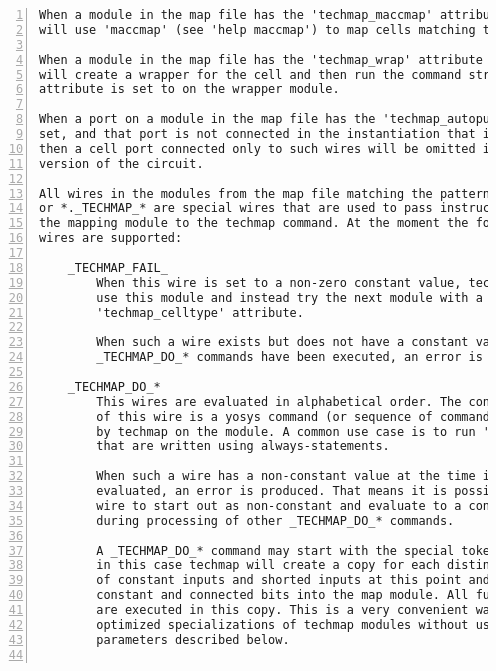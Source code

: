 \begin{lstlisting}[numbers=left,frame=single]
When a module in the map file has the 'techmap_maccmap' attribute set, techmap
will use 'maccmap' (see 'help maccmap') to map cells matching the module.

When a module in the map file has the 'techmap_wrap' attribute set, techmap
will create a wrapper for the cell and then run the command string that the
attribute is set to on the wrapper module.

When a port on a module in the map file has the 'techmap_autopurge' attribute
set, and that port is not connected in the instantiation that is mapped, then
then a cell port connected only to such wires will be omitted in the mapped
version of the circuit.

All wires in the modules from the map file matching the pattern _TECHMAP_*
or *._TECHMAP_* are special wires that are used to pass instructions from
the mapping module to the techmap command. At the moment the following special
wires are supported:

    _TECHMAP_FAIL_
        When this wire is set to a non-zero constant value, techmap will not
        use this module and instead try the next module with a matching
        'techmap_celltype' attribute.

        When such a wire exists but does not have a constant value after all
        _TECHMAP_DO_* commands have been executed, an error is generated.

    _TECHMAP_DO_*
        This wires are evaluated in alphabetical order. The constant text value
        of this wire is a yosys command (or sequence of commands) that is run
        by techmap on the module. A common use case is to run 'proc' on modules
        that are written using always-statements.

        When such a wire has a non-constant value at the time it is to be
        evaluated, an error is produced. That means it is possible for such a
        wire to start out as non-constant and evaluate to a constant value
        during processing of other _TECHMAP_DO_* commands.

        A _TECHMAP_DO_* command may start with the special token 'CONSTMAP; '.
        in this case techmap will create a copy for each distinct configuration
        of constant inputs and shorted inputs at this point and import the
        constant and connected bits into the map module. All further commands
        are executed in this copy. This is a very convenient way of creating
        optimized specializations of techmap modules without using the special
        parameters described below.


\end{lstlisting}
